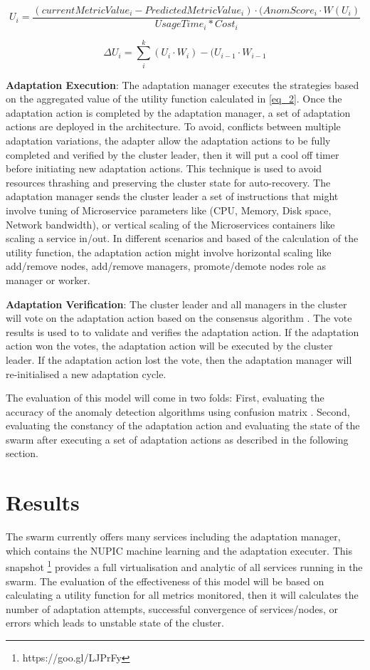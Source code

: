 \documentclass[sigconf]{acmart}
\begin{document}
\begin{equation}
\label{eq_3}
 U_{i} = \frac{(currentMetricValue_{i} - PredictedMetricValue_{i})\cdot (AnomScore_{i} \cdot W(U_{i})}{UsageTime_{i} * Cost_{i}}
\end{equation}


 \begin{equation}
\label{eq_4}
\Delta U_{i}=\sum_{i}^{k} (U_{i}\cdot W_{i})-(U_{i-1}\cdot W_{i-1}
\end{equation}


\textbf{Adaptation Execution}: The adaptation manager executes the strategies based on the aggregated value of the utility function calculated in \ref{eq_2}. Once the adaptation action is completed by the adaptation manager, a set of adaptation actions are deployed in the architecture. To avoid, conflicts between multiple adaptation variations, the adapter allow the adaptation actions to be fully completed and verified by the cluster leader, then it will put a cool off timer before initiating new adaptation actions. This technique is used to avoid resources thrashing and preserving the cluster state for auto-recovery. The adaptation manager sends the cluster leader a set of instructions that might involve tuning of Microservice parameters like (CPU, Memory, Disk space, Network bandwidth), or vertical scaling of the Microservices containers like scaling a service in/out. In different scenarios and based of the calculation of the utility function, the adaptation action might involve horizontal scaling like add/remove nodes, add/remove managers, promote/demote nodes role as manager or worker. 

\textbf{Adaptation Verification}: The cluster leader and all managers in the cluster will vote on the adaptation action based on the consensus algorithm \cite{ongaro2015raft}. The vote results is used to to validate and verifies the adaptation action. If the adaptation action won the votes, the adaptation action will be executed by the cluster leader. If the adaptation action lost the vote, then the adaptation manager will re-initialised a new adaptation cycle.   
 
The evaluation of this model will come in two folds: First, evaluating the accuracy of the anomaly detection algorithms using confusion matrix \cite{kohavi1998confusion}.
Second, evaluating the constancy of the adaptation action and evaluating the state of the swarm after executing a set of adaptation actions as described in the following section. 

\section{Results} 
\label{sec:evaluation}
The swarm currently offers many services including the adaptation manager, which contains the NUPIC machine learning and the adaptation executer. This snapshot \footnote{https://goo.gl/LJPrFy} provides a full virtualisation and analytic of all services running in the swarm. The evaluation of the effectiveness of this model will be based on calculating a utility function for all metrics monitored, then it will calculates the number of adaptation attempts, successful convergence of services/nodes, or errors which leads to unstable state of the cluster. 
\end{document}
